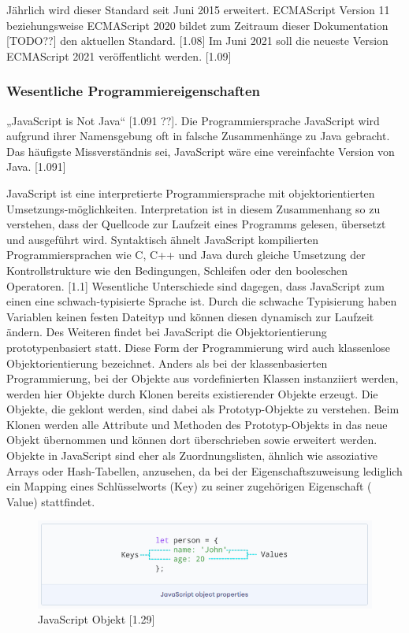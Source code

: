 \noindent
Jährlich wird dieser Standard seit Juni 2015 erweitert. ECMAScript Version 11 beziehungs\-weise ECMAScript 2020 bildet zum Zeitraum dieser Dokumentation [TODO??] den aktuellen Standard. [1.08] 
Im Juni 2021 soll die neueste Version ECMAScript 2021 veröffentlicht werden.  [1.09]
\newline

\subsubsection{Wesentliche Programmiereigenschaften}
„JavaScript is Not Java“ [1.091 ??]. Die Programmiersprache JavaScript wird aufgrund ihrer Namensgebung oft in falsche Zusammenhänge zu Java gebracht. Das häufigste Missverständnis sei, JavaScript wäre eine vereinfachte Version von Java. [1.091]
\newline


\noindent
JavaScript ist eine interpretierte Programmiersprache mit objektorientierten Umsetzungs-möglichkeiten. Interpretation ist in diesem Zusammenhang so zu verstehen, dass der Quellcode zur Laufzeit eines Programms gelesen, übersetzt und ausgeführt wird.
Syntaktisch ähnelt JavaScript kompilierten Programmiersprachen wie C, C++ und Java durch gleiche Umsetzung der Kontrollstrukture wie den Bedingungen, Schleifen oder den booleschen Operatoren. [1.1] Wesentliche Unterschiede sind dagegen, dass JavaScript zum einen eine schwach-typisierte Sprache ist. Durch die schwache Typisierung haben Variablen keinen festen Dateityp und können diesen dynamisch zur Laufzeit ändern. Des Weiteren findet bei JavaScript die Objektorientierung prototypenbasiert statt. Diese Form der Programmierung wird auch klassenlose Objektorientierung bezeichnet. Anders als bei der klassenbasierten Programmierung, bei der Objekte aus vor\-de\-fi\-niert\-en Klassen instanziiert werden, werden hier Objekte durch Klonen bereits existierender Objekte erzeugt. Die Objekte, die geklont werden, sind dabei als Prototyp-Objekte zu ver\-steh\-en. Beim Klonen werden alle Attribute und Methoden des Prototyp-Objekts in das neue Objekt übernommen und können dort überschrieben sowie erweitert werden. Objekte in JavaScript sind eher als Zuordnungslisten, ähnlich wie assoziative Arrays oder Hash-Tabellen, anzusehen, da bei der Eigenschaftszuweisung lediglich ein Mapping eines Schlüsselworts (Key) zu seiner zugehörigen Eigenschaft ( Value) stattfindet.
\newline

\begin{figure}[h]
\centering
\includegraphics[width=\textwidth]{images/JavaScript_Object.PNG}
\caption{JavaScript Objekt [1.29]}
\end{figure}



